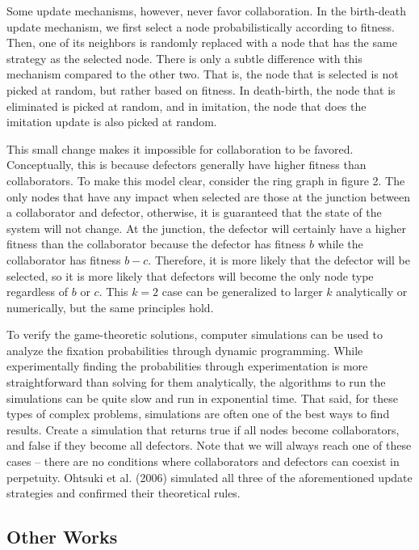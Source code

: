 \documentclass[11pt]{article}
\begin{document}
Some update mechanisms, however, never favor collaboration. In the birth-death update mechanism, we first select a node probabilistically according to fitness. Then, one of its neighbors is randomly replaced with a node that has the same strategy as the selected node. There is only a subtle difference with this mechanism compared to the other two. That is, the node that is selected is not picked at random, but rather based on fitness. In death-birth, the node that is eliminated is picked at random, and in imitation, the node that does the imitation update is also picked at random. 

This small change makes it impossible for collaboration to be favored. Conceptually, this is because defectors generally have higher fitness than collaborators. To make this model clear, consider the ring graph in figure 2. The only nodes that have any impact when selected are those at the junction between a collaborator and defector, otherwise, it is guaranteed that the state of the system will not change. At the junction, the defector will certainly have a higher fitness than the collaborator because the defector has fitness $b$ while the collaborator has fitness $b - c$. Therefore, it is more likely that the defector will be selected, so it is more likely that defectors will become the only node type regardless of $b$ or $c$. This $k = 2$ case can be generalized to larger $k$ analytically or numerically, but the same principles hold. 

To verify the game-theoretic solutions, computer simulations can be used to analyze the fixation probabilities through dynamic programming. While experimentally finding the probabilities through experimentation is more straightforward than solving for them analytically, the algorithms to run the simulations can be quite slow and run in exponential time. That said, for these types of complex problems, simulations are often one of the best ways to find results. Create a simulation that returns true if all nodes become collaborators, and false if they become all defectors. Note that we will always reach one of these cases -- there are no conditions where collaborators and defectors can coexist in perpetuity. Ohtsuki et al. (2006) simulated all three of the aforementioned update strategies and confirmed their theoretical rules.

\subsection{Other Works}
\end{document}
